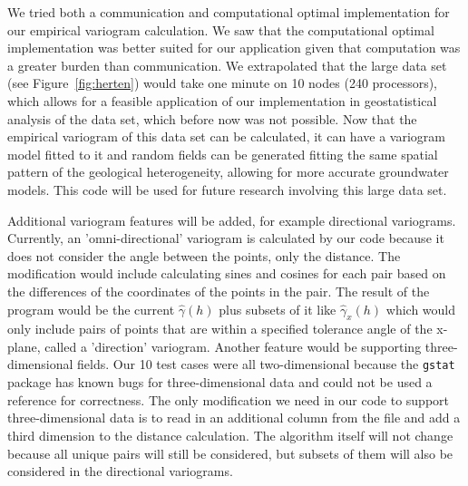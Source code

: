 
We tried both a communication and computational optimal implementation for our empirical variogram calculation. We saw that the computational optimal implementation was better suited for our application given that computation was a greater burden than communication. We extrapolated that the large data set (see Figure~\ref{fig:herten}) would take one minute on 10 nodes (240 processors), which allows for a feasible application of our implementation in geostatistical analysis of the data set, which before now was not possible. Now that the empirical variogram of this data set can be calculated, it can have a variogram model fitted to it and random fields can be generated fitting the same spatial pattern of the geological heterogeneity, allowing for more accurate groundwater models. This code will be used for future research involving this large data set. 

Additional variogram features will be added, for example directional variograms. Currently, an 'omni-directional' variogram is calculated by our code because it does not consider the angle between the points, only the distance. The modification would include calculating sines and cosines for each pair based on the differences of the coordinates of the points in the pair. The result of the program would be the current $\hat{\gamma}(h)$ plus subsets of it like $\hat{\gamma}_x(h)$ which would only include pairs of points that are within a specified tolerance angle of the x-plane, called a 'direction' variogram. Another feature would be supporting three-dimensional fields. Our 10 test cases were all two-dimensional because the \texttt{gstat} package has known bugs for three-dimensional data and could not be used a reference for correctness. The only modification we need in our code to support three-dimensional data is to read in an additional column from the file and add a third dimension to the distance calculation. The algorithm itself will not change because all unique pairs will still be considered, but subsets of them will also be considered in the directional variograms. 

